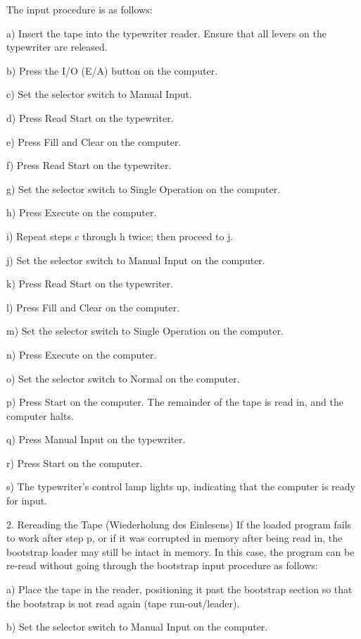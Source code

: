 \documentclass{article}
\begin{document}
\begin{enumerate}
The input procedure is as follows:

a) Insert the tape into the typewriter reader. Ensure that all levers on the typewriter are released.

b) Press the I/O (E/A) button on the computer.

c) Set the selector switch to \textsf{Manual Input}.

d) Press \textsf{Read Start} on the typewriter.

e) Press \textsf{Fill and Clear} on the computer.

f) Press \textsf{Read Start} on the typewriter.

g) Set the selector switch to \textsf{Single Operation} on the computer.

h) Press \textsf{Execute} on the computer.

i) Repeat steps c through h twice; then proceed to j.

j) Set the selector switch to \textsf{Manual Input} on the computer.

k) Press \textsf{Read Start} on the typewriter.

l) Press \textsf{Fill and Clear} on the computer.

m) Set the selector switch to \textsf{Single Operation} on the computer.

n) Press \textsf{Execute} on the computer.

o) Set the selector switch to \textsf{Normal} on the computer.

p) Press \textsf{Start} on the computer. The remainder of the tape is read in, and the computer halts.

q) Press \textsf{Manual Input} on the typewriter.

r) Press \textsf{Start} on the computer.

s) The typewriter's control lamp lights up, indicating that the computer is ready for input.

2. Rereading the Tape (Wiederholung des Einlesens)
If the loaded program fails to work after step p, or if it was corrupted in memory after being read in, the bootstrap loader may still be intact in memory. In this case, the program can be re-read without going through the bootstrap input procedure as follows:

a) Place the tape in the reader, positioning it past the bootstrap section so that the bootstrap is not read again (tape run-out/leader).

b) Set the selector switch to \textsf{Manual Input} on the computer.


\end{enumerate}
\end{document}
